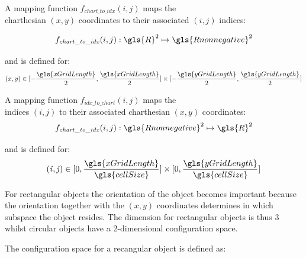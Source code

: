 A mapping function $f_\mathit{chart\_to\_idx}(i,j)$ maps the\\charthesian $(x,y)$ coordinates to their associated $(i,j)$ indices:

\[f_\mathit{chart\_to\_idx}(i,j): \gls{R}^2 \mapsto \gls{Rnonnegative}^2 \]

and is defined for: 
\[ \mathit{(x, y)} \in [-\frac{\gls{xGridLength}}{2}, \frac{\gls{xGridLength}}{2}] \times [-\frac{\gls{yGridLength}}{2}, \frac{\gls{yGridLength}}{2}]\]

A mapping function $f_\mathit{idx\_to\_chart}(i, j)$ maps the\\indices $(i, j)$ to their associated charthesian $(x,y)$ coordinates:
\[f_\mathit{chart\_to\_idx}(i,j): \gls{Rnonnegative}^2  \mapsto \gls{R}^2 \]

and is defined for:
\[ \mathit{(i, j)} \in [0, \frac{\gls{xGridLength}}{\gls{cellSize}}] \times [0, \frac{\gls{yGridLength}}{\gls{cellSize}}]\]


For rectangular objects the orientation of the object becomes important because the orientation together with the $\mathit{(x, y)}$ coordinates determines in which subspace the object resides. The dimension for rectangular objects is thus 3 whilst circular objects have a 2-dimensional configuration space.\bs

The configuration space for a recangular object is defined as:\bs

